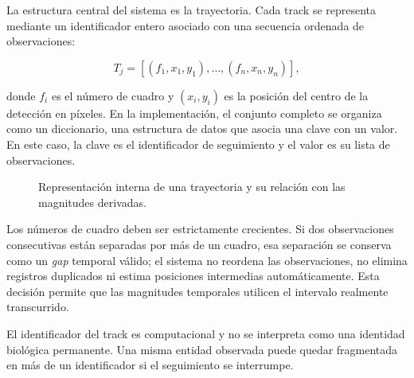 La estructura central del sistema es la trayectoria. Cada track se representa mediante un identificador entero asociado con una secuencia ordenada de observaciones:

\[
T_j=\left[(f_1,x_1,y_1),\ldots,(f_n,x_n,y_n)\right],
\]

donde $f_i$ es el número de cuadro y $(x_i,y_i)$ es la posición del centro de la detección en píxeles. En la implementación, el conjunto completo se organiza como un diccionario, una estructura de datos que asocia una clave con un valor. En este caso, la clave es el identificador de seguimiento y el valor es su lista de observaciones.

\begin{figure}[H]
  \centering
  \caption{Representación interna de una trayectoria y su relación con las magnitudes derivadas.}
  \label{fig:representacion-track}
\end{figure}

Los números de cuadro deben ser estrictamente crecientes. Si dos observaciones consecutivas están separadas por más de un cuadro, esa separación se conserva como un \textit{gap} temporal válido; el sistema no reordena las observaciones, no elimina registros duplicados ni estima posiciones intermedias automáticamente. Esta decisión permite que las magnitudes temporales utilicen el intervalo realmente transcurrido.

El identificador del track es computacional y no se interpreta como una identidad biológica permanente. Una misma entidad observada puede quedar fragmentada en más de un identificador si el seguimiento se interrumpe.

